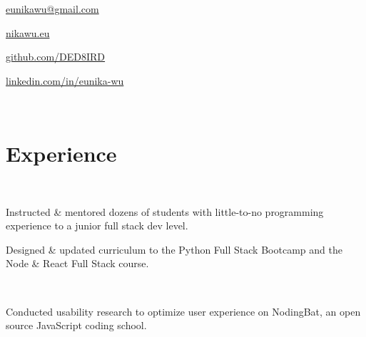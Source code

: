 \documentclass[]{hieudo-build}
\begin{document}
{
	\ci{\faAt} \href{mailto:eunikawu@gmail.com}{ eunikawu@gmail.com } 
	\par
    \ci{\faGlobe} \href{https://nikawu.eu}{ nikawu.eu } \par
	\ci{\faGithub} \href{https://github.com/DED8IRD}{ github.com/DED8IRD } 
	\par
	\ci{\faLinkedinSquare} \href{https://www.linkedin.com/in/eunika-wu/}{ linkedin.com/in/eunika-wu }
	\par
}
\sectionsep \\
\titlerule
\smallskip
%
%
\begin{minipage}[t]{0.63\textwidth} 

\section{Experience}

 \\
\vspace{\topsep}
\begin{tightemize}
\item Instructed \& mentored dozens of students with little-to-no programming experience to a junior full stack dev level. \\
\item Designed \& updated curriculum to the Python Full Stack Bootcamp and the Node \& React Full Stack course. \\
\smallskip
{}
{}
\end{tightemize}
\sectionsep

 \\
\begin{tightemize}
\item Conducted usability research to optimize user experience on NodingBat, an open source JavaScript coding school. \\
\smallskip
{}
\end{tightemize}
\sectionsep


\end{minipage}
\end{document}

